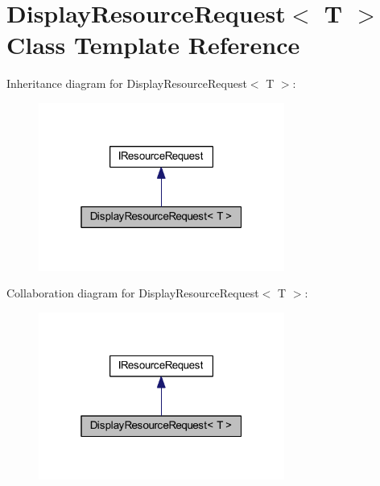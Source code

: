 \hypertarget{class_display_resource_request}{}\section{Display\+Resource\+Request$<$ T $>$ Class Template Reference}
\label{class_display_resource_request}


Inheritance diagram for Display\+Resource\+Request$<$ T $>$\+:
\nopagebreak
\begin{figure}[H]
\begin{center}
\leavevmode
\includegraphics[width=229pt]{class_display_resource_request__inherit__graph}
\end{center}
\end{figure}


Collaboration diagram for Display\+Resource\+Request$<$ T $>$\+:
\nopagebreak
\begin{figure}[H]
\begin{center}
\leavevmode
\includegraphics[width=229pt]{class_display_resource_request__coll__graph}
\end{center}
\end{figure}

